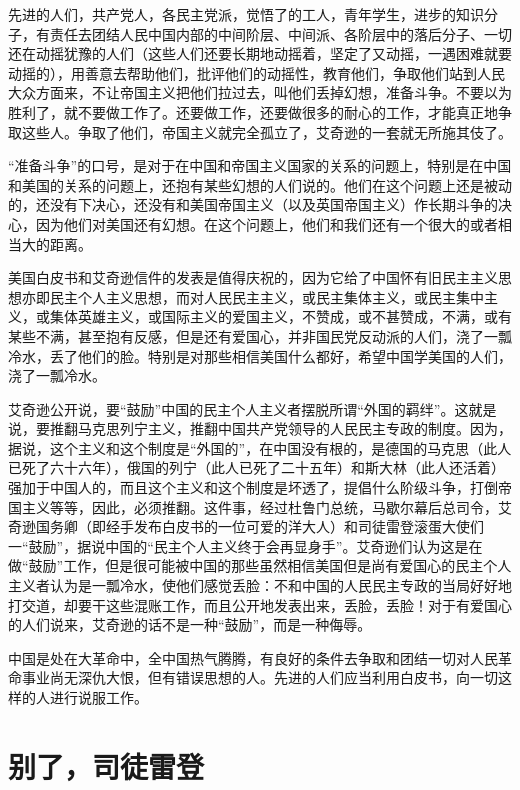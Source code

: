 \documentclass[UTF-8, a5paper, 12pt]{ctexart}
\begin{document}
先进的人们，共产党人，各民主党派，觉悟了的工人，青年学生，进步的知识分子，有责任去团结人民中国内部的中间阶层、中间派、各阶层中的落后分子、一切还在动摇犹豫的人们（这些人们还要长期地动摇着，坚定了又动摇，一遇困难就要动摇的），用善意去帮助他们，批评他们的动摇性，教育他们，争取他们站到人民大众方面来，不让帝国主义把他们拉过去，叫他们丢掉幻想，准备斗争。不要以为胜利了，就不要做工作了。还要做工作，还要做很多的耐心的工作，才能真正地争取这些人。争取了他们，帝国主义就完全孤立了，艾奇逊的一套就无所施其伎了。

“准备斗争”的口号，是对于在中国和帝国主义国家的关系的问题上，特别是在中国和美国的关系的问题上，还抱有某些幻想的人们说的。他们在这个问题上还是被动的，还没有下决心，还没有和美国帝国主义（以及英国帝国主义）作长期斗争的决心，因为他们对美国还有幻想。在这个问题上，他们和我们还有一个很大的或者相当大的距离。

美国白皮书和艾奇逊信件的发表是值得庆祝的，因为它给了中国怀有旧民主主义思想亦即民主个人主义思想，而对人民民主主义，或民主集体主义，或民主集中主义，或集体英雄主义，或国际主义的爱国主义，不赞成，或不甚赞成，不满，或有某些不满，甚至抱有反感，但是还有爱国心，并非国民党反动派的人们，浇了一瓢冷水，丢了他们的脸。特别是对那些相信美国什么都好，希望中国学美国的人们，浇了一瓢冷水。

艾奇逊公开说，要“鼓励”中国的民主个人主义者摆脱所谓“外国的羁绊”。这就是说，要推翻马克思列宁主义，推翻中国共产党领导的人民民主专政的制度。因为，据说，这个主义和这个制度是“外国的”，在中国没有根的，是德国的马克思（此人已死了六十六年），俄国的列宁（此人已死了二十五年）和斯大林（此人还活着）强加于中国人的，而且这个主义和这个制度是坏透了，提倡什么阶级斗争，打倒帝国主义等等，因此，必须推翻。这件事，经过杜鲁门总统，马歇尔幕后总司令，艾奇逊国务卿（即经手发布白皮书的一位可爱的洋大人）和司徒雷登滚蛋大使们一“鼓励”，据说中国的“民主个人主义终于会再显身手”。艾奇逊们认为这是在做“鼓励”工作，但是很可能被中国的那些虽然相信美国但是尚有爱国心的民主个人主义者认为是一瓢冷水，使他们感觉丢脸：不和中国的人民民主专政的当局好好地打交道，却要干这些混账工作，而且公开地发表出来，丢脸，丢脸！对于有爱国心的人们说来，艾奇逊的话不是一种“鼓励”，而是一种侮辱。

中国是处在大革命中，全中国热气腾腾，有良好的条件去争取和团结一切对人民革命事业尚无深仇大恨，但有错误思想的人。先进的人们应当利用白皮书，向一切这样的人进行说服工作。

\section{别了，司徒雷登}
\end{document}
